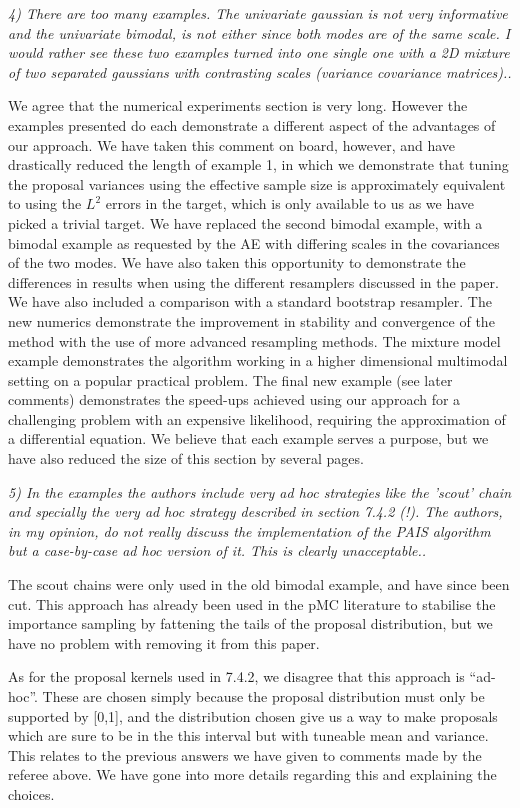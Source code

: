 \documentclass{article}
\newcommand{\comment}[2]{\vspace{0.6cm}{\bf Comment:} {\it #1.}

\vspace{0.3cm}{\bf Answer:} #2}
\begin{document}
\comment{4) There are too many examples. The univariate gaussian is not very informative and the univariate bimodal, is not either since both modes are of the same scale. I would rather see these two examples turned into one single one with a 2D mixture of two separated gaussians with contrasting scales (variance covariance matrices).}{We agree that the numerical experiments section is very long. However the examples presented do each demonstrate a different aspect of the advantages of our approach. We have taken this comment on board, however, and have drastically reduced the length of example 1, in which we demonstrate that tuning the proposal variances using the effective sample size is approximately equivalent to using the $L^2$ errors in the target, which is only available to us as we have picked a trivial target. We have replaced the second bimodal example, with a bimodal example as requested by the AE with differing scales in the covariances of the two modes. We have also taken this opportunity to demonstrate the differences in results when using the different resamplers discussed in the paper. We have also included a comparison with a standard bootstrap resampler. The new numerics demonstrate the improvement in stability and convergence of the method with the use of more advanced resampling methods. The mixture model example demonstrates the algorithm working in a higher dimensional multimodal setting on a popular practical problem. The final new example (see later comments) demonstrates the speed-ups achieved using our approach for a challenging problem with an expensive likelihood, requiring the approximation of a differential equation. We believe that each example serves a purpose, but we have also reduced the size of this section by several pages.}

\comment{5) In the examples the authors include very ad hoc strategies like the 'scout' chain and specially the very ad hoc strategy described in section 7.4.2 (!). The authors, in my opinion, do not really discuss the implementation of the PAIS algorithm but a case-by-case ad hoc version of it. This is clearly unacceptable.}{The scout chains were only used in the old bimodal example, and have since been cut. This approach has already been used in the pMC literature to stabilise the importance sampling by fattening the tails of the proposal distribution, but we have no problem with removing it from this paper.

  As for the proposal kernels used in 7.4.2, we disagree that this approach is ``ad-hoc''. These are chosen simply because the proposal distribution must only be supported by [0,1], and the distribution chosen give us a way to make proposals which are sure to be in the this interval but with tuneable mean and variance. This relates to the previous answers we have given to comments made by the referee above. We have gone into more details regarding this and explaining the choices.}
\end{document}
